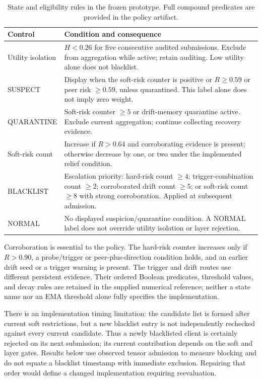 \documentclass[conference,compsoc]{IEEEtran}
\begin{document}
\begin{table}[t]
\caption{State and eligibility rules in the frozen prototype. Full compound predicates are provided in the policy artifact.}
\label{tab:states}
\centering\footnotesize
\begin{tabular}{@{}>{\raggedright\arraybackslash}p{1.95cm}>{\raggedright\arraybackslash}p{6.05cm}@{}}
\toprule
Control & Condition and consequence\\
\midrule
Utility isolation & $H<0.26$ for five consecutive audited submissions. Exclude from aggregation while active; retain auditing. Low utility alone does not blacklist.\\
SUSPECT & Display when the soft-risk counter is positive or $R\ge0.59$ or peer risk $\ge0.59$, unless quarantined. This label alone does not imply zero weight.\\
QUARANTINE & Soft-risk counter $\ge5$ or drift-memory quarantine active. Exclude current aggregation; continue collecting recovery evidence.\\
Soft-risk count & Increase if $R>0.64$ and corroborating evidence is present; otherwise decrease by one, or two under the implemented relief condition.\\
BLACKLIST & Escalation priority: hard-risk count $\ge4$; trigger-combination count $\ge2$; corroborated drift count $\ge5$; or soft-risk count $\ge8$ with strong corroboration. Applied at subsequent admission.\\
NORMAL & No displayed suspicion/quarantine condition. A NORMAL label does not override utility isolation or layer rejection.\\
\bottomrule
\end{tabular}
\end{table}

Corroboration is essential to the policy. The hard-risk counter increases only if $R>0.90$, a probe/trigger or peer-plus-direction condition holds, and an earlier drift seed or a trigger warning is present. The trigger and drift routes use different persistent evidence. Their ordered Boolean predicates, threshold values, and decay rules are retained in the supplied numerical reference; neither a state name nor an EMA threshold alone fully specifies the implementation.

There is an implementation timing limitation: the candidate list is formed after current soft restrictions, but a new blacklist entry is not independently rechecked against every current candidate. Thus a newly blacklisted client is certainly rejected on its next submission; its current contribution depends on the soft and layer gates. Results below use observed tensor admission to measure blocking and do not equate a blacklist timestamp with immediate exclusion. Repairing that order would define a changed implementation requiring reevaluation.
\end{document}
